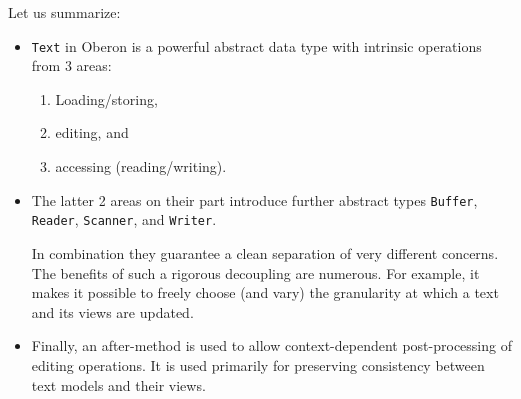 Let us summarize:
\begin{itemize}
  \item \verb|Text| in Oberon is a powerful abstract data type with intrinsic operations from 3 areas:
    \begin{enumerate}
      \item Loading/storing,
      \item editing, and
      \item accessing (reading/writing).
    \end{enumerate}
  \item The latter 2 areas on their part introduce further abstract types
    \verb|Buffer|, \verb|Reader|, \verb|Scanner|, and \verb|Writer|.

    In combination they guarantee a clean separation of very different concerns.
    The benefits of such a rigorous decoupling are numerous.
    For example, it makes it possible to freely choose (and vary) the granularity
    at which a text and its views are updated.
  \item Finally, an after-method is used to allow context-dependent post-processing of editing operations.
    It is used primarily for preserving consistency between text models and their views.
\end{itemize}

